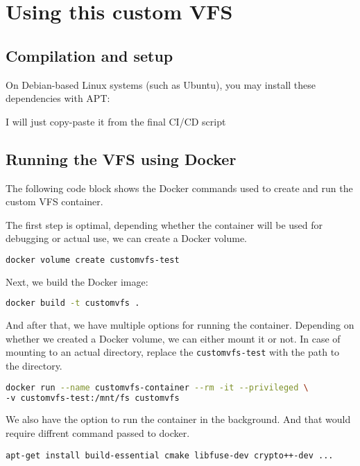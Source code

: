 \chapter{Using this custom VFS}

\section*{Compilation and setup}

On Debian-based Linux systems (such as Ubuntu), you may install these dependencies with APT:

I will just copy-paste it from the final CI/CD script


\section{Running the VFS using Docker}\label{sec:docker-guide}

The following code block shows the Docker commands used to create and run the custom VFS container.

The first step is optimal, depending whether the container will be used for debugging or actual use, we can create a Docker volume.

\begin{lstlisting}[language=bash, basicstyle=\ttfamily\small]
docker volume create customvfs-test
\end{lstlisting}

Next, we build the Docker image:

\begin{lstlisting}[language=bash, basicstyle=\ttfamily\small]
docker build -t customvfs .
\end{lstlisting}

And after that, we have multiple options for running the container.
Depending on whether we created a Docker volume, we can either mount it or not.
In case of mounting to an actual directory, replace the \texttt{customvfs-test} with the path to the directory.

\begin{lstlisting}[language=bash, basicstyle=\ttfamily\small]
docker run --name customvfs-container --rm -it --privileged \
-v customvfs-test:/mnt/fs customvfs
\end{lstlisting}

We also have the option to run the container in the background.
And that would require diffrent command passed to docker.

\begin{Verbatim}
apt-get install build-essential cmake libfuse-dev crypto++-dev ...
\end{Verbatim}

